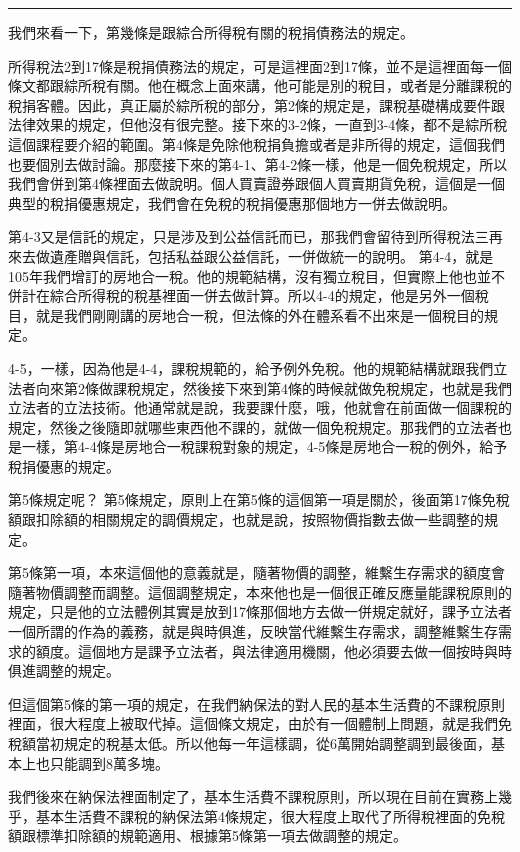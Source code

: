 \documentclass[oneside,sub3section]{ctexbook}
\begin{document}
\begin{center}\rule{0.5\linewidth}{0.5pt}\end{center}

我們來看一下，第幾條是跟綜合所得稅有關的稅捐債務法的規定。

所得稅法2到17條是稅捐債務法的規定，可是這裡面2到17條，並不是這裡面每一個條文都跟綜所稅有關。他在概念上面來講，他可能是別的稅目，或者是分離課稅的稅捐客體。因此，真正屬於綜所稅的部分，第2條的規定是，課稅基礎構成要件跟法律效果的規定，但他沒有很完整。接下來的3-2條，一直到3-4條，都不是綜所稅這個課程要介紹的範圍。第4條是免除他稅捐負擔或者是非所得的規定，這個我們也要個別去做討論。那麼接下來的第4-1、第4-2條一樣，他是一個免稅規定，所以我們會併到第4條裡面去做說明。個人買賣證券跟個人買賣期貨免稅，這個是一個典型的稅捐優惠規定，我們會在免稅的稅捐優惠那個地方一併去做說明。

第4-3又是信託的規定，只是涉及到公益信託而已，那我們會留待到所得稅法三再來去做遺產贈與信託，包括私益跟公益信託，一併做統一的說明。
第4-4，就是105年我們增訂的房地合一稅。他的規範結構，沒有獨立稅目，但實際上他也並不併計在綜合所得稅的稅基裡面一併去做計算。所以4-4的規定，他是另外一個稅目，就是我們剛剛講的房地合一稅，但法條的外在體系看不出來是一個稅目的規定。

4-5，一樣，因為他是4-4，課稅規範的，給予例外免稅。他的規範結構就跟我們立法者向來第2條做課稅規定，然後接下來到第4條的時候就做免稅規定，也就是我們立法者的立法技術。他通常就是說，我要課什麼，哦，他就會在前面做一個課稅的規定，然後之後隨即就哪些東西他不課的，就做一個免稅規定。那我們的立法者也是一樣，第4-4條是房地合一稅課稅對象的規定，4-5條是房地合一稅的例外，給予稅捐優惠的規定。

第5條規定呢？ 第5條規定，原則上在第5條的這個第一項是關於，後面第17條免稅額跟扣除額的相關規定的調價規定，也就是說，按照物價指數去做一些調整的規定。

第5條第一項，本來這個他的意義就是，隨著物價的調整，維繫生存需求的額度會隨著物價調整而調整。這個調整規定，本來他也是一個很正確反應量能課稅原則的規定，只是他的立法體例其實是放到17條那個地方去做一併規定就好，課予立法者一個所謂的作為的義務，就是與時俱進，反映當代維繫生存需求，調整維繫生存需求的額度。這個地方是課予立法者，與法律適用機關，他必須要去做一個按時與時俱進調整的規定。

但這個第5條的第一項的規定，在我們納保法的對人民的基本生活費的不課稅原則裡面，很大程度上被取代掉。這個條文規定，由於有一個體制上問題，就是我們免稅額當初規定的稅基太低。所以他每一年這樣調，從6萬開始調整調到最後面，基本上也只能調到8萬多塊。

我們後來在納保法裡面制定了，基本生活費不課稅原則，所以現在目前在實務上幾乎，基本生活費不課稅的納保法第4條規定，很大程度上取代了所得稅裡面的免稅額跟標準扣除額的規範適用、根據第5條第一項去做調整的規定。
\end{document}
